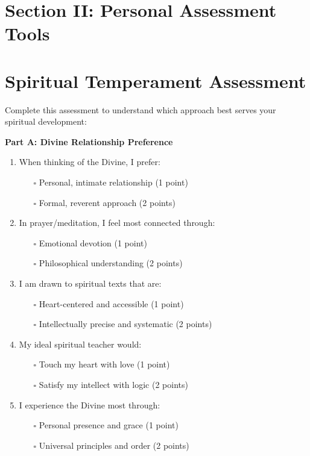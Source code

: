 \documentclass[11pt,twoside]{book}
\begin{document}
\section*{Section II: Personal Assessment Tools}
\label{sec:org728f83a}

\section*{Spiritual Temperament Assessment}
\label{sec:orgbbecc3a}

Complete this assessment to understand which approach best serves your spiritual development:

\textbf{\textbf{Part A: Divine Relationship Preference}}

\begin{enumerate}
\item When thinking of the Divine, I prefer:
\begin{itemize}
\item[{$\square$}] Personal, intimate relationship (1 point)
\item[{$\square$}] Formal, reverent approach (2 points)
\end{itemize}

\item In prayer/meditation, I feel most connected through:
\begin{itemize}
\item[{$\square$}] Emotional devotion (1 point)
\item[{$\square$}] Philosophical understanding (2 points)
\end{itemize}

\item I am drawn to spiritual texts that are:
\begin{itemize}
\item[{$\square$}] Heart-centered and accessible (1 point)
\item[{$\square$}] Intellectually precise and systematic (2 points)
\end{itemize}

\item My ideal spiritual teacher would:
\begin{itemize}
\item[{$\square$}] Touch my heart with love (1 point)
\item[{$\square$}] Satisfy my intellect with logic (2 points)
\end{itemize}

\item I experience the Divine most through:
\begin{itemize}
\item[{$\square$}] Personal presence and grace (1 point)
\item[{$\square$}] Universal principles and order (2 points)
\end{itemize}
\end{enumerate}
\end{document}
